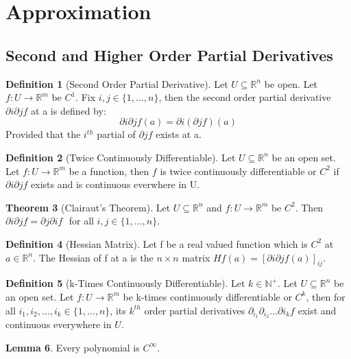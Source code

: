 \documentclass[12pt]{article}
\theoremstyle{definition}
\newtheorem{definition}{Definition}[subsection]
\newtheorem{lemma}[definition]{Lemma}
\newtheorem{theorem}[definition]{Theorem}
\theoremstyle{remark}
\begin{document}
\section{Approximation}
\subsection {Second and Higher Order Partial Derivatives}
\begin{definition}[Second Order Partial Derivative]
Let $U\subseteq \mathbb{R}^n$ be open. Let $f: U\rightarrow \mathbb{R}^m$ be $C^1$. Fix $i,j\in\{1,...,n\}$, then the second order partial derivative $\partial i\partial jf$ at a is defined by:
\[
\partial i\partial jf(a)=\partial i(\partial jf)(a)
\]
Provided that the $i^{th}$ partial of $\partial j f$ exists at a.
\end{definition}

\begin{definition}[Twice Continuously Differentiable]
Let $U\subseteq \mathbb{R}^n$ be an open set. Let $f: U\rightarrow \mathbb{R}^m$ be a function, then $f$ is twice continuously differentiable or $C^2$ if $\partial i \partial j f$ exists and is continuous everwhere in U.
\end{definition}

\begin{theorem}[Clairaut's Theorem]
Let $U\subseteq \mathbb{R}^n$ and $f: U\rightarrow \mathbb{R}^m$ be $C^2$. Then $\partial i\partial j f=\partial j\partial i f\text{ }$for all $i,j\in\{1,...,n\}.$
\end{theorem}

\begin{definition}[Hessian Matrix]
Let f be a real valued function which is $C^2$ at $a\in\mathbb{R}^n$. The Hessian of f at a is the $n\times n$ matrix $Hf(a)=[\partial i\partial jf(a)]_{ij}.$
\end{definition}

\begin{definition}[k-Times Continuously Differentiable]
Let $k\in\mathbb{N}^+$. Let $U\subseteq \mathbb{R}^n$ be an open set. Let $f: U\rightarrow\mathbb{R}^m$ be k-times continuously differentiable or $C^k$, then for all $i_1,i_2,...,i_k\in\{1,...,n\}$, its $k^{th}$ order partial derivatives $\partial_{i_1} \partial_{i_2}...\partial{i_k} f$ exist and continuous everywhere in $U$.
\end{definition}

\begin{lemma}
Every polynomial is $C^\infty.$
\end{lemma}
\end{document}
